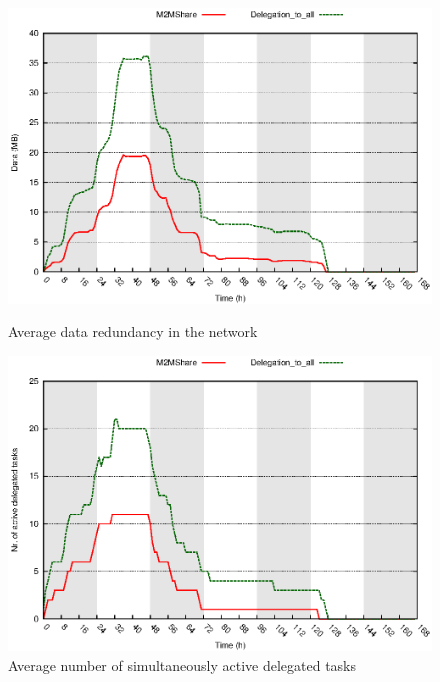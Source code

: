 \begin{figure}[ht]
\begin{minipage}[b]{0.5\linewidth}
\centering
\includegraphics[scale=0.5]{grafici/ridondanza.eps}
\caption{Average data redundancy in the network}
\label{graficoRidondanzaData}
\end{minipage}
\hspace{0.5cm}
\begin{minipage}[b]{0.5\linewidth}
\centering
\includegraphics[scale=0.5]{grafici/delegheAttive.eps}
\caption{Average number of simultaneously active delegated tasks}
\label{graficoDelegheAttive}
\end{minipage}
\end{figure}

\newpage 
